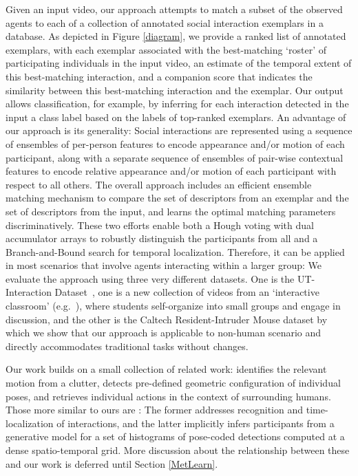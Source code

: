 \documentclass[10pt,twocolumn,letterpaper]{article}
\begin{document}
Given an input video, our approach attempts to match a subset of the observed agents to each of a collection of annotated social interaction exemplars in a database. As depicted in Figure \ref{diagram}, we provide a ranked list of annotated exemplars, with each exemplar associated with the best-matching `roster' of participating individuals in the input video, an estimate of the temporal extent of this best-matching interaction, and a companion score that indicates the similarity between this best-matching interaction and the exemplar. Our output allows classification, for example, by inferring for each interaction detected in the input a class label based on the labels of top-ranked exemplars. An advantage of our approach is its generality: Social interactions are represented using a sequence of ensembles of per-person features to encode appearance and/or motion of each participant, along with a separate sequence of ensembles of pair-wise contextual features to encode relative appearance and/or motion of each participant with respect to all others. The overall approach includes an efficient ensemble matching mechanism to compare the set of descriptors from an exemplar and the set of descriptors from the input, and learns the optimal matching parameters discriminatively. These two efforts enable both a Hough voting with dual accumulator arrays to robustly distinguish the participants from all and a Branch-and-Bound search for temporal localization. Therefore, it can be applied in most scenarios that involve agents interacting within a larger group: We evaluate the approach using three very different datasets. One is the UT-Interaction Dataset~\cite{Ryoo:group}, one is a new collection of videos from an `interactive classroom' (e.g.~\cite{Crouch:PI}), where students self-organize into small groups and engage in discussion, and the other is the Caltech Resident-Intruder Mouse dataset \cite{CRIM13} by which we show that our approach is applicable to non-human scenario and directly accommodates traditional tasks without changes.

Our work builds on a small collection of related work: \cite{Li:segmentation} identifies the relevant motion from a clutter, \cite{Cristani:discovery} detects pre-defined geometric configuration of individual poses, and \cite{Lan:retrieval} retrieves individual actions in the context of surrounding humans. Those more similar to ours are \cite{Ryoo:group,Amer:group}: The former addresses recognition and time-localization of interactions, and the latter implicitly infers participants from a generative model for a set of histograms of pose-coded detections computed at a dense spatio-temporal grid. More discussion about the relationship between these and our work is deferred until Section \ref{MetLearn}.
\end{document}
